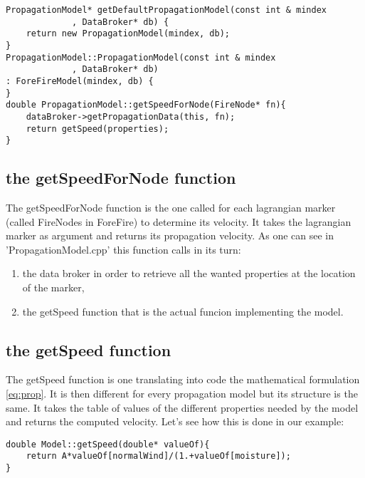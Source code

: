 \begin{lstlisting}[caption={PropagationModel.cpp},frame=single]
PropagationModel* getDefaultPropagationModel(const int & mindex
             , DataBroker* db) {
	return new PropagationModel(mindex, db);
}
PropagationModel::PropagationModel(const int & mindex
             , DataBroker* db)
: ForeFireModel(mindex, db) {
}
double PropagationModel::getSpeedForNode(FireNode* fn){
	dataBroker->getPropagationData(this, fn);
	return getSpeed(properties);
}
\end{lstlisting}

\subsection*{the getSpeedForNode function}

The getSpeedForNode function is the one called for each lagrangian marker (called FireNodes in ForeFire) to determine its velocity. It takes the lagrangian marker as argument and returns its propagation velocity. As one can see in 'PropagationModel.cpp' this function calls in its turn: 
\begin{enumerate}
	\item the data broker in order to retrieve all the wanted properties at the location of the marker,
	\item the getSpeed function that is the actual funcion implementing the model.
\end{enumerate}

\begin{center}
\end{center}

\subsection*{the getSpeed function}

The getSpeed function is one translating into code the mathematical formulation \ref{eq:prop}. It is then different for every propagation model but its structure is the same. It takes the table of values of the different properties needed by the model and returns the computed velocity. Let's see how this is done in our example:
\begin{lstlisting}[caption={getSpeed},frame=single]
double Model::getSpeed(double* valueOf){
	return A*valueOf[normalWind]/(1.+valueOf[moisture]);
}
\end{lstlisting}

